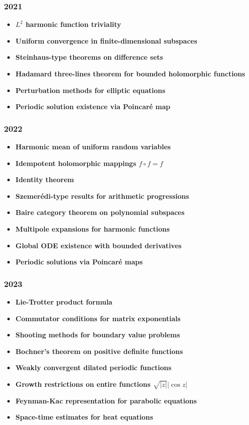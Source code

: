 \subsubsection*{2021}
\begin{itemize}
    \item \textbf{$L^2$ harmonic function triviality}
    \item \textbf{Uniform convergence in finite-dimensional subspaces}
    \item \textbf{Steinhaus-type theorems on difference sets}
    \item \textbf{Hadamard three-lines theorem for bounded holomorphic functions}
    \item \textbf{Perturbation methods for elliptic equations}
    \item \textbf{Periodic solution existence via Poincar\'e map}
\end{itemize}

\subsubsection*{2022}
\begin{itemize}
    \item \textbf{Harmonic mean of uniform random variables}
    \item \textbf{Idempotent holomorphic mappings $f \circ f = f$}
    \item \textbf{Identity theorem}
    \item \textbf{Szemer\'edi-type results for arithmetic progressions}
    \item \textbf{Baire category theorem on polynomial subspaces}
    \item \textbf{Multipole expansions for harmonic functions}
    \item \textbf{Global ODE existence with bounded derivatives}
    \item \textbf{Periodic solutions via Poincar\'e maps}
\end{itemize}

\subsubsection*{2023}
\begin{itemize}
    \item \textbf{Lie-Trotter product formula}
    \item \textbf{Commutator conditions for matrix exponentials}
    \item \textbf{Shooting methods for boundary value problems}
    \item \textbf{Bochner's theorem on positive definite functions}
    \item \textbf{Weakly convergent dilated periodic functions}
    \item \textbf{Growth restrictions on entire functions $\sqrt{|z|}|\cos z|$}
    \item \textbf{Feynman-Kac representation for parabolic equations}
    \item \textbf{Space-time estimates for heat equations}
\end{itemize}

